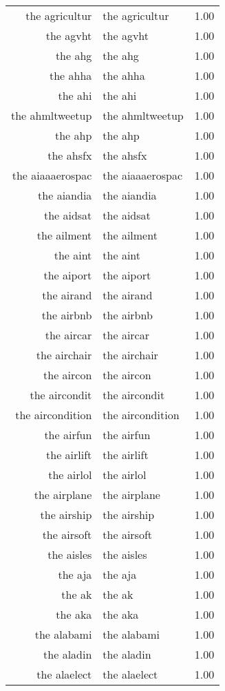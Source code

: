 \begin{table}[ht]
\begin{tabular}{rlr}
  the agricultur & the agricultur & 1.00 \\ 
  the agvht & the agvht & 1.00 \\ 
  the ahg & the ahg & 1.00 \\ 
  the ahha & the ahha & 1.00 \\ 
  the ahi & the ahi & 1.00 \\ 
  the ahmltweetup & the ahmltweetup & 1.00 \\ 
  the ahp & the ahp & 1.00 \\ 
  the ahsfx & the ahsfx & 1.00 \\ 
  the aiaaaerospac & the aiaaaerospac & 1.00 \\ 
  the aiandia & the aiandia & 1.00 \\ 
  the aidsat & the aidsat & 1.00 \\ 
  the ailment & the ailment & 1.00 \\ 
  the aint & the aint & 1.00 \\ 
  the aiport & the aiport & 1.00 \\ 
  the airand & the airand & 1.00 \\ 
  the airbnb & the airbnb & 1.00 \\ 
  the aircar & the aircar & 1.00 \\ 
  the airchair & the airchair & 1.00 \\ 
  the aircon & the aircon & 1.00 \\ 
  the aircondit & the aircondit & 1.00 \\ 
  the aircondition & the aircondition & 1.00 \\ 
  the airfun & the airfun & 1.00 \\ 
  the airlift & the airlift & 1.00 \\ 
  the airlol & the airlol & 1.00 \\ 
  the airplane & the airplane & 1.00 \\ 
  the airship & the airship & 1.00 \\ 
  the airsoft & the airsoft & 1.00 \\ 
  the aisles & the aisles & 1.00 \\ 
  the aja & the aja & 1.00 \\ 
  the ak & the ak & 1.00 \\ 
  the aka & the aka & 1.00 \\ 
  the alabami & the alabami & 1.00 \\ 
  the aladin & the aladin & 1.00 \\ 
  the alaelect & the alaelect & 1.00 \\ 

\end{tabular}
\end{table}
